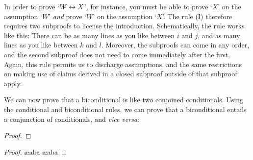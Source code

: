 In order to prove `$W \leftrightarrow X$', for instance, you must be able to prove `$X$' on the assumption `$W$' \emph{and} prove `$W$' on the assumption `$X$'. The  rule ({\eiff}I) therefore requires two subproofs to license the introduction. Schematically, the rule works like this:
There can be as many lines as you like between $i$ and $j$, and as many lines as you like between $k$ and $l$. Moreover, the subproofs can come in any order, and the second subproof does not need to come immediately after the first. Again, this rule permits us to discharge assumptions, and the same restrictions on making use of claims derived in a closed subproof outside of that subproof apply.

We can now prove that a biconditional is like two conjoined conditionals. Using the conditional and biconditional rules, we can prove that a biconditional entails a conjunction of conditionals, and \emph{vice versa}: 

\hspace{-1cm}\begin{minipage}{0.5\textwidth}
	 \begin{proof}
	\open {}
	\open {}
	\close
	\open
	\close
\end{proof}\end{minipage}\quad \begin{minipage}{0.5\textwidth}
	\begin{proof}
		\ae{aba}
		\open {}
		\close
		\ae{aba}
		\open {}
		\close
	\end{proof}
\end{minipage}

